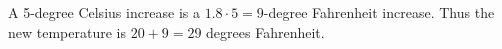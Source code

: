 A 5-degree Celsius increase is a $1.8\cdot5=9$-degree Fahrenheit increase. Thus the new temperature is $20+9=\boxed{29}$ degrees Fahrenheit.
